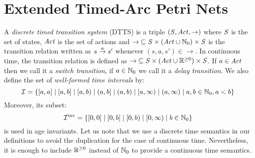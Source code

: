 \section{Extended Timed-Arc Petri Nets} \label{sec:def}
A \emph{discrete timed transition system} (DTTS) 
is a triple $\left(\mathit{S}, \mathit{Act},\rightarrow\right)$
where $\mathit{S}$ is the set of states, $\mathit{Act}$ is the set of actions
and $\rightarrow\: \subseteq \mathit{S} \times (\mathit{Act} \cup \mathbb{N}_{0})  \times \mathit{S}$ is the 
transition relation written as $s \stackrel{a}{\rightarrow} s'$ whenever $(s,a,s') \in \rightarrow$. In continuous time,
the transition relation is defined as $\rightarrow\: \subseteq \mathit{S} \times (\mathit{Act} \cup \mathbb{R}^{\geq 0})  \times \mathit{S}$.
If $a \in \mathit{Act}$ then we call it a \emph{switch transition}, if
$a \in \mathbb{N}_{0}$ we call it a \emph{delay transition}.
We also define the set of \emph{well-formed time intervals} 
by: $$\mathcal{I} =\{ [a,a] \;|\; [a,b] \;|\; [a,b) \;|\; (a,b] \;|\; (a,b) \;|\; [a,\infty) \;|\; (a,\infty) \mid a,b \in \mathbb{N}_{0},a < b\}$$
Moreover, its subset: $$\mathcal{I}^{\text{inv}} = \{ [0,0] \;|\; [0,b] \;|\; [0,b) \;|\; [0,\infty) \mid b \in \mathbb{N}_{0}\}$$
is used in age invariants. Let us note that we use a discrete time semantics in our definitions 
to avoid the duplication for the case of continuous time. Nevertheless, it is enough to include $\mathbb{R}^{\geq 0}$ instead of $\mathbb{N}_{0}$ to provide a continuous time semantics.


